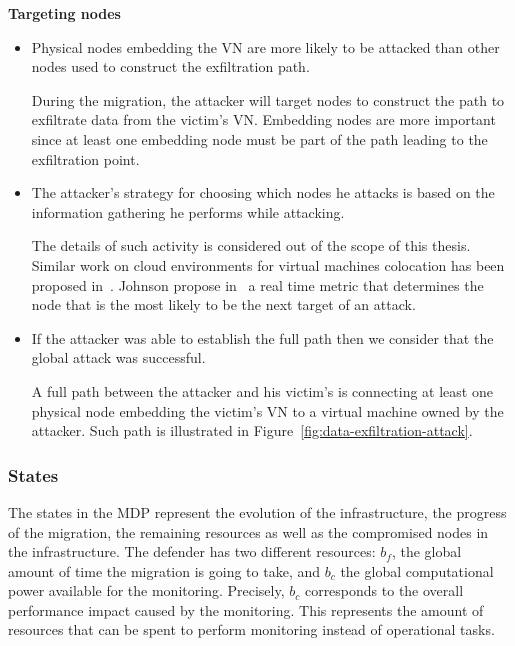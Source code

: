 \textbf{Targeting nodes}
\begin{itemize}
    \item  Physical nodes embedding the VN are more likely to be attacked than other nodes used to construct the exfiltration path.
    
    During the migration, the attacker will target nodes to construct the path to exfiltrate data from the victim's VN.
    Embedding nodes are more important since at least one embedding node must be part of the path leading to the exfiltration point.
    
    \item The attacker's strategy for choosing which nodes he attacks is based on the information gathering he performs while attacking. 
    
    The details of such activity is considered out of the scope of this thesis.
    Similar work on cloud environments for virtual machines colocation has been proposed in~\cite{getoffmucloud-Ristenpart2009, incentivemtd-Zhang2012}.
    Johnson \etal propose in~\cite{mitigateAPT-johnson2013} a real time metric that determines the node that is the most likely to be the next target of an attack.
    
    \item
    If the attacker was able to establish the full path then we consider that the global attack was successful.
    
    A full path between the attacker and his victim's is connecting at least one physical node embedding the victim's VN to a virtual machine owned by the attacker. Such path is illustrated in Figure~\ref{fig:data-exfiltration-attack}.
\end{itemize}



\subsubsection{States}
\label{sec:stateset}
The states in the MDP represent the evolution of the infrastructure, \ie the progress of the migration, the remaining resources as well as the compromised nodes in the infrastructure.
The defender has two different resources: $b_f$, the global amount of time the migration is going to take, and $b_c$ the global computational power available for the monitoring.
Precisely, $b_c$ corresponds to the overall performance impact caused by the monitoring. %
This represents the amount of resources that can be spent to perform monitoring instead of operational tasks.

